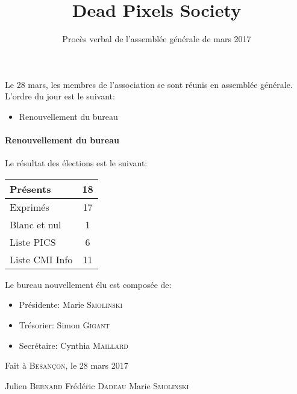 \documentclass{article}
\title{Dead Pixels Society}
\author{Procès verbal de l'assemblée générale de mars 2017}
\date{}
\begin{document}
\maketitle

Le 28 mars, les membres de l'association se sont réunis en assemblée générale. L'ordre du jour est le suivant:

\begin{itemize}
\item
  Renouvellement du bureau
\end{itemize}

\paragraph{Renouvellement du bureau}

Le résultat des élections est le suivant:

\begin{center}
\begin{tabular}{|l|c|}
\hline
Présents & 18 \\
\hline
Exprimés & 17 \\
\hline
Blanc et nul & 1 \\
\hline
\hline
Liste PICS & 6 \\
\hline
Liste CMI Info & 11 \\
\hline
\end{tabular}
\end{center}

Le bureau nouvellement élu est composée de:
\begin{itemize}
\item
  Présidente: Marie \textsc{Smolinski}
\item
  Trésorier: Simon \textsc{Gigant}
\item
  Secrétaire: Cynthia \textsc{Maillard}
\end{itemize}

\bigskip

\begin{flushright}
Fait à \textsc{Besançon}, le 28 mars 2017
\end{flushright}

\begin{center}
Julien \textsc{Bernard} \hspace{0.5em} Frédéric \textsc{Dadeau} \hspace{0.5em} Marie \textsc{Smolinski}
\end{center}
\end{document}
